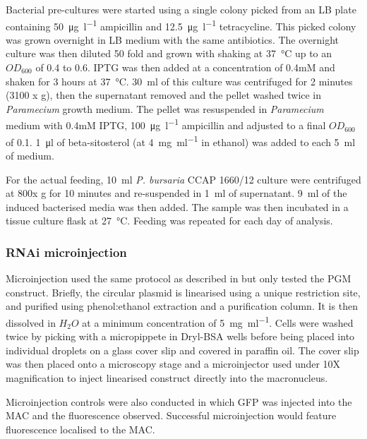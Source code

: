 Bacterial pre-cultures were started using a single colony picked from an LB
plate containing \SI{50}{\micro\gram\per\litre} ampicillin and \SI{12.5}{\micro\gram\per\litre} tetracycline.
This picked colony was grown overnight in LB medium with the same antibiotics.
The overnight culture was then diluted 50 fold and grown with shaking
at \SI{37}{\degreeCelsius} up to an \(OD_{600}\) of 0.4 to 0.6. IPTG
was then added at a concentration of 0.4mM and shaken for 3 hours
at \SI{37}{\degreeCelsius}.  \SI{30}{\milli\litre} of this culture was centrifuged for 
2 minutes (3100 x g),
then the supernatant removed and the pellet washed twice in \textit{Paramecium}
growth medium. The pellet was resuspended in \textit{Paramecium} medium with 0.4mM IPTG,
\SI{100}{\micro\gram\per\litre} ampicillin and adjusted to a final \(OD_{600}\) of 0.1.
\SI{1}{\micro\litre} of beta-sitosterol (at \SI{4}{\milli\gram\per\milli\litre} in ethanol) was added
to each \SI{5}{\milli\litre} of medium.

For the actual feeding, \SI{10}{\milli\litre} \textit{P. bursaria} CCAP 1660/12 culture
were centrifuged at 800x g for 10 minutes and re-suspended in \SI{1}{\milli\litre} of supernatant.
\SI{9}{\milli\litre} of the induced bacterised media was then added.  The sample was
then incubated in a tissue culture flask at \SI{27}{\degreeCelsius}.
Feeding was repeated for each day of analysis. 

\subsubsection{RNAi microinjection}

Microinjection used the same protocol as described in \citep{Beisson2010b} 
but only tested the PGM construct.
Briefly, the circular plasmid is linearised using a unique restriction site,
and purified using phenol:ethanol extraction and a purification column.
It is then dissolved in \(H_{2}O\) at a minimum concentration of 
\SI{5}{\milli\gram\per\milli\litre}.
Cells were washed twice by picking with a micropippete in Dryl-BSA wells before
being placed into individual droplets on a glass cover slip and covered in paraffin oil.
The cover slip was then placed onto a microscopy stage and a microinjector 
used under 10X magnification to inject linearised construct directly into the
macronucleus.

Microinjection controls were also conducted in which GFP was injected
into the MAC and the fluorescence observed.  Successful microinjection
would feature fluorescence localised to the MAC.


